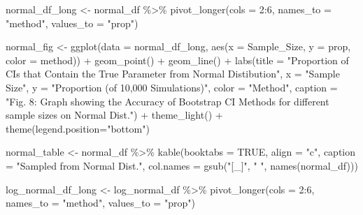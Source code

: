 \documentclass[12pt]{article}
\newenvironment{Shaded}{\begin{snugshade}}{\end{snugshade}}
\newcommand{\AttributeTok}[1]{\textcolor[rgb]{0.77,0.63,0.00}{#1}}
\newcommand{\ConstantTok}[1]{\textcolor[rgb]{0.00,0.00,0.00}{#1}}
\newcommand{\DecValTok}[1]{\textcolor[rgb]{0.00,0.00,0.81}{#1}}
\newcommand{\FunctionTok}[1]{\textcolor[rgb]{0.00,0.00,0.00}{#1}}
\newcommand{\NormalTok}[1]{#1}
\newcommand{\OtherTok}[1]{\textcolor[rgb]{0.56,0.35,0.01}{#1}}
\newcommand{\SpecialCharTok}[1]{\textcolor[rgb]{0.00,0.00,0.00}{#1}}
\newcommand{\StringTok}[1]{\textcolor[rgb]{0.31,0.60,0.02}{#1}}
\begin{document}
\begin{Shaded}
\begin{Highlighting}[]
\NormalTok{normal\_df\_long }\OtherTok{\textless{}{-}}\NormalTok{ normal\_df }\SpecialCharTok{\%\textgreater{}\%}
  \FunctionTok{pivot\_longer}\NormalTok{(}\AttributeTok{cols =} \DecValTok{2}\SpecialCharTok{:}\DecValTok{6}\NormalTok{, }\AttributeTok{names\_to =} \StringTok{"method"}\NormalTok{, }\AttributeTok{values\_to =} \StringTok{"prop"}\NormalTok{) }
    
\NormalTok{normal\_fig }\OtherTok{\textless{}{-}} \FunctionTok{ggplot}\NormalTok{(}\AttributeTok{data =}\NormalTok{ normal\_df\_long, }
                    \FunctionTok{aes}\NormalTok{(}\AttributeTok{x =}\NormalTok{ Sample\_Size, }\AttributeTok{y =}\NormalTok{ prop, }\AttributeTok{color =}\NormalTok{ method)) }\SpecialCharTok{+} 
  \FunctionTok{geom\_point}\NormalTok{() }\SpecialCharTok{+} \FunctionTok{geom\_line}\NormalTok{() }\SpecialCharTok{+} 
  \FunctionTok{labs}\NormalTok{(}\AttributeTok{title =} \StringTok{"Proportion of CIs that Contain the True Parameter from Normal }
\StringTok{       Distibution"}\NormalTok{, }\AttributeTok{x =} \StringTok{"Sample Size"}\NormalTok{, }
       \AttributeTok{y =} \StringTok{"Proportion (of 10,000 Simulations)"}\NormalTok{, }\AttributeTok{color =} \StringTok{"Method"}\NormalTok{,}
       \AttributeTok{caption =} \StringTok{"Fig. 8: Graph showing the Accuracy of Bootstrap CI Methods for different sample sizes on Normal Dist."}\NormalTok{) }\SpecialCharTok{+}
  \FunctionTok{theme\_light}\NormalTok{() }\SpecialCharTok{+}
  \FunctionTok{theme}\NormalTok{(}\AttributeTok{legend.position=}\StringTok{"bottom"}\NormalTok{)}
      
\NormalTok{normal\_table }\OtherTok{\textless{}{-}}\NormalTok{ normal\_df }\SpecialCharTok{\%\textgreater{}\%}
  \FunctionTok{kable}\NormalTok{(}\AttributeTok{booktabs =} \ConstantTok{TRUE}\NormalTok{, }\AttributeTok{align =} \StringTok{"c"}\NormalTok{, }\AttributeTok{caption =} \StringTok{"Sampled from Normal Dist."}\NormalTok{, }
        \AttributeTok{col.names =} \FunctionTok{gsub}\NormalTok{(}\StringTok{"[\_]"}\NormalTok{, }\StringTok{" "}\NormalTok{, }\FunctionTok{names}\NormalTok{(normal\_df)))}

\NormalTok{log\_normal\_df\_long }\OtherTok{\textless{}{-}}\NormalTok{ log\_normal\_df }\SpecialCharTok{\%\textgreater{}\%}
  \FunctionTok{pivot\_longer}\NormalTok{(}\AttributeTok{cols =} \DecValTok{2}\SpecialCharTok{:}\DecValTok{6}\NormalTok{, }\AttributeTok{names\_to =} \StringTok{"method"}\NormalTok{, }\AttributeTok{values\_to =} \StringTok{"prop"}\NormalTok{) }
    

\end{Highlighting}
\end{Shaded}
\end{document}
